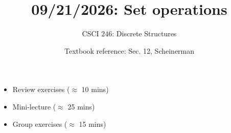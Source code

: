 \documentclass[10pt]{beamer}
\begin{document}






\title{09/21/2026: Set operations}
\author{CSCI 246: Discrete Structures}
\date{Textbook reference: Sec. 12, Scheinerman}

\begin{frame}
    \titlepage 
\end{frame}


\begin{frame}
\footnotesize 

%
%
%


\begin{myyellowbox}[title=Today's Agenda]
\begin{itemize}
	\item Review exercises ($\approx$ 10 mins)
	\item Mini-lecture ($\approx$ 25 mins)
	\item Group exercises ($\approx$ 15 mins)
\end{itemize}

\end{myyellowbox}
\vfill 

\end{frame}
\end{document}
